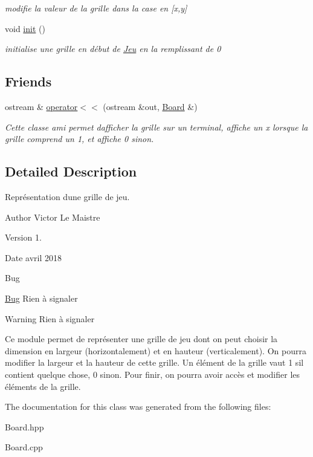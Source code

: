 \begin{DoxyCompactItemize}
\begin{DoxyCompactList}\small\item\em modifie la valeur de la grille dans la case en \mbox{[}x,y\mbox{]} \end{DoxyCompactList}\item 
\mbox{\label{classBoard_a2cf5d799795f86a50d5d6eb4bd353b93}} 
void \hyperlink{classBoard_a2cf5d799795f86a50d5d6eb4bd353b93}{init} ()
\begin{DoxyCompactList}\small\item\em initialise une grille en début de \hyperlink{classJeu}{Jeu} en la remplissant de 0 \end{DoxyCompactList}\end{DoxyCompactItemize}
\subsection*{Friends}
\begin{DoxyCompactItemize}
\item 
\mbox{\label{classBoard_aa4c1980eaf4ad187b9af05d10567dae3}} 
ostream \& \hyperlink{classBoard_aa4c1980eaf4ad187b9af05d10567dae3}{operator$<$$<$} (ostream \&out, \hyperlink{classBoard}{Board} \&)
\begin{DoxyCompactList}\small\item\em Cette classe ami permet d\textquotesingle{}afficher la grille sur un terminal, affiche un x lorsque la grille comprend un 1, et affiche 0 sinon. \end{DoxyCompactList}\end{DoxyCompactItemize}


\subsection{Detailed Description}
Représentation d\textquotesingle{}une grille de jeu. 

\begin{DoxyAuthor}{Author}
Victor Le Maistre 
\end{DoxyAuthor}
\begin{DoxyVersion}{Version}
1. 
\end{DoxyVersion}
\begin{DoxyDate}{Date}
avril 2018 
\end{DoxyDate}
\begin{DoxyRefDesc}{Bug}
\item[\hyperlink{bug__bug000002}{Bug}]Rien à signaler \end{DoxyRefDesc}
\begin{DoxyWarning}{Warning}
Rien à signaler
\end{DoxyWarning}
Ce module permet de représenter une grille de jeu dont on peut choisir la dimension en largeur (horizontalement) et en hauteur (verticalement). On pourra modifier la largeur et la hauteur de cette grille. Un élément de la grille vaut 1 s\textquotesingle{}il contient quelque chose, 0 sinon. Pour finir, on pourra avoir accès et modifier les éléments de la grille. 

The documentation for this class was generated from the following files\+:\begin{DoxyCompactItemize}
\item 
Board.\+hpp\item 
Board.\+cpp\end{DoxyCompactItemize}

